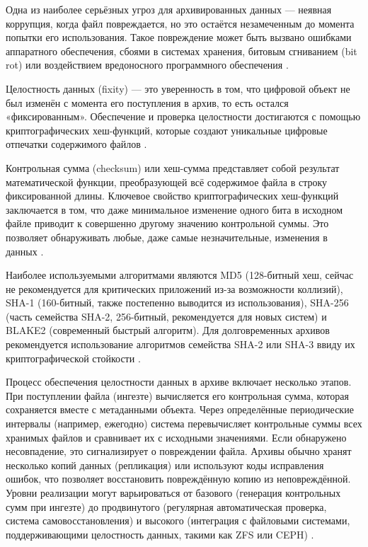 \documentclass{SibFU-docs}
\begin{document}

Одна из наиболее серьёзных угроз для архивированных данных — неявная коррупция, когда файл повреждается, но это остаётся незамеченным до момента попытки его использования. Такое повреждение может быть вызвано ошибками аппаратного обеспечения, сбоями в системах хранения, битовым сгниванием (bit rot) или воздействием вредоносного программного обеспечения \cite{OrbisFileFixity2014, LibraryOfCongress2012FileFixityDataIntegrity}.

Целостность данных (fixity) — это уверенность в том, что цифровой объект не был изменён с момента его поступления в архив, то есть остался «фиксированным». Обеспечение и проверка целостности достигаются с помощью криптографических хеш-функций, которые создают уникальные цифровые отпечатки содержимого файлов \cite{OrbisFileFixityDetailed2008}.

Контрольная сумма (checksum) или хеш-сумма представляет собой результат математической функции, преобразующей всё содержимое файла в строку фиксированной длины. Ключевое свойство криптографических хеш-функций заключается в том, что даже минимальное изменение одного бита в исходном файле приводит к совершенно другому значению контрольной суммы. Это позволяет обнаруживать любые, даже самые незначительные, изменения в данных \cite{LibraryOfCongress2012FileFixityDataIntegrity}.

Наиболее используемыми алгоритмами являются MD5 (128-битный хеш, сейчас не рекомендуется для критических приложений из-за возможности коллизий), SHA-1 (160-битный, также постепенно выводится из использования), SHA-256 (часть семейства SHA-2, 256-битный, рекомендуется для новых систем) и BLAKE2 (современный быстрый алгоритм). Для долговременных архивов рекомендуется использование алгоритмов семейства SHA-2 или SHA-3 ввиду их криптографической стойкости \cite{OrbisFileFixityDetailed2008}.

Процесс обеспечения целостности данных в архиве включает несколько этапов. При поступлении файла (ингезте) вычисляется его контрольная сумма, которая сохраняется вместе с метаданными объекта. Через определённые периодические интервалы (например, ежегодно) система перевычисляет контрольные суммы всех хранимых файлов и сравнивает их с исходными значениями. Если обнаружено несовпадение, это сигнализирует о повреждении файла. Архивы обычно хранят несколько копий данных (репликация) или используют коды исправления ошибок, что позволяет восстановить повреждённую копию из неповреждённой. Уровни реализации могут варьироваться от базового (генерация контрольных сумм при ингезте) до продвинутого (регулярная автоматическая проверка, система самовосстановления) и высокого (интеграция с файловыми системами, поддерживающими целостность данных, такими как ZFS или CEPH) \cite{ElectronicArtsIntermix1996PreservationStrategies}.
\end{document}

